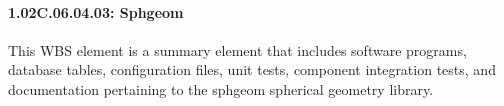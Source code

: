 \paragraph{1.02C.06.04.03: Sphgeom}

This WBS element is a summary element that includes software programs, database tables, configuration files, unit tests, component integration tests, and documentation pertaining to the sphgeom spherical geometry library.
